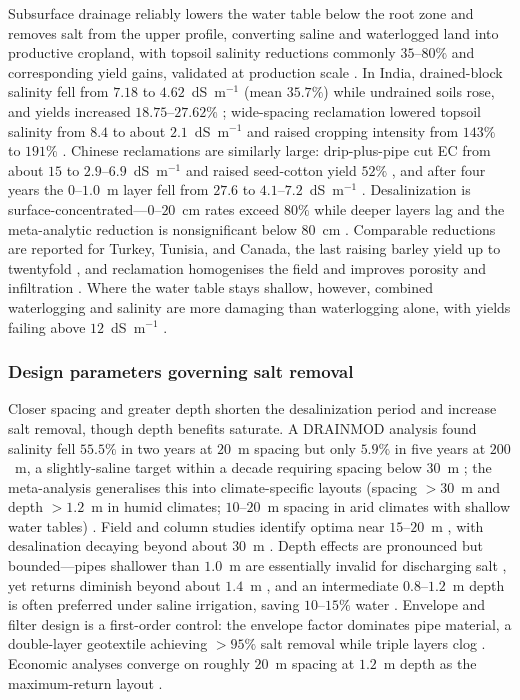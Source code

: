 Subsurface drainage reliably lowers the water table below the root zone and
removes salt from the upper profile, converting saline and waterlogged land into
productive cropland, with topsoil salinity reductions commonly $35$--$80\%$ and
corresponding yield gains, validated at production scale
\parencite{Yang2025,Derby2024}. In India, drained-block salinity fell from
$7.18$ to $4.62$~dS~m$^{-1}$ (mean $35.7\%$) while undrained soils rose, and
yields increased $18.75$--$27.62\%$ \parencite{Sharma2006}; wide-spacing
reclamation lowered topsoil salinity from $8.4$ to about $2.1$~dS~m$^{-1}$ and
raised cropping intensity from $143\%$ to $191\%$ \parencite{Manjunatha2004}.
Chinese reclamations are similarly large: drip-plus-pipe cut EC from about
$15$ to $2.9$--$6.9$~dS~m$^{-1}$ and raised seed-cotton yield $52\%$
\parencite{Heng2021}, and after four years the $0$--$1.0$~m layer fell from
$27.6$ to $4.1$--$7.2$~dS~m$^{-1}$ \parencite{Zhang2021}. Desalinization
is surface-concentrated---$0$--$20$~cm rates exceed $80\%$ while deeper layers
lag and the meta-analytic reduction is nonsignificant below $80$~cm
\parencite{Han2023,Yang2025}. Comparable reductions are reported for Turkey,
Tunisia, and Canada, the last raising barley yield up to twentyfold
\parencite{Bahçeci2009,HajAmor2019,Steppuhn2006,Steppuhn2017}, and reclamation
homogenises the field and improves porosity and infiltration
\parencite{Yu2015,Yu2025,Sharma2000}. Where the water table stays shallow,
however, combined waterlogging and salinity are more damaging than waterlogging
alone, with yields failing above $12$~dS~m$^{-1}$ \parencite{Kahlown2002}.

\subsubsection{Design parameters governing salt removal}

Closer spacing and greater depth shorten the desalinization period and increase
salt removal, though depth benefits saturate. A DRAINMOD analysis found salinity
fell $55.5\%$ in two years at $20$~m spacing but only $5.9\%$ in five years at
$200$~m, a slightly-saline target within a decade requiring spacing below $30$~m
\parencite{Chen2025}; the meta-analysis generalises this into climate-specific
layouts (spacing $>30$~m and depth $>1.2$~m in humid climates; $10$--$20$~m
spacing in arid climates with shallow water tables) \parencite{Yang2025}. Field
and column studies identify optima near $15$--$20$~m
\parencite{Wang2020,Han2023,Chen2022}, with desalination decaying beyond about
$30$~m \parencite{Zhu2025b}. Depth effects are pronounced but bounded---pipes
shallower than $1.0$~m are essentially invalid for discharging salt
\parencite{Qian2021b}, yet returns diminish beyond about $1.4$~m
\parencite{Bahçeci2007,Bahçeci2006}, and an intermediate $0.8$--$1.2$~m depth is
often preferred under saline irrigation, saving $10$--$15\%$ water
\parencite{Feng2017,Muhammad2021}. Envelope and filter design is a first-order
control: the envelope factor dominates pipe material, a double-layer geotextile
achieving $>95\%$ salt removal while triple layers clog
\parencite{Li2022,Wang2024d,Elzoghby2021}. Economic analyses converge on roughly
$20$~m spacing at $1.2$~m depth as the maximum-return layout \parencite{Chen2025}.

